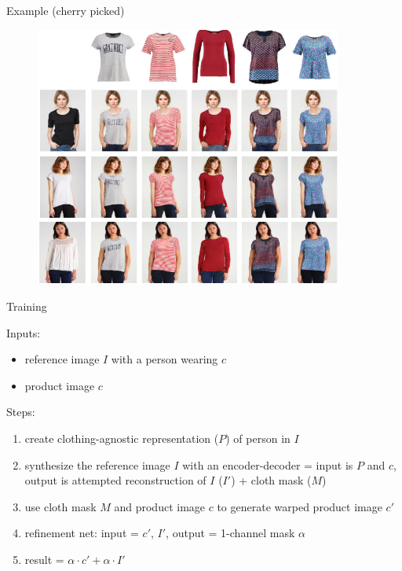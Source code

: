 \documentclass{beamer}
\begin{document}
\begin{frame}{Example (cherry picked)}

\begin{figure}[h]
\includegraphics[width=0.9\textwidth]{img/examples}
\end{figure}

\end{frame}
\begin{frame}{Training}

Inputs:
\begin{itemize}
\item reference image $I$ with a person wearing $c$ 
\item product image $c$
\end{itemize}

\vfill

Steps:
\begin{enumerate}
\item create clothing-agnostic representation ($P$) of person in $I$
\item synthesize the reference image $I$ with an encoder-decoder = input is $P$ and $c$, output is attempted reconstruction of $I$ ($I'$) + cloth mask ($M$)
\item use cloth mask $M$ and product image $c$ to generate warped product image $c'$
\item refinement net: input = $c'$, $I'$, output = 1-channel mask $\alpha$
\item result = $\alpha \cdot c' + \alpha \cdot I'$
\end{enumerate}

\end{frame}
\end{document}
